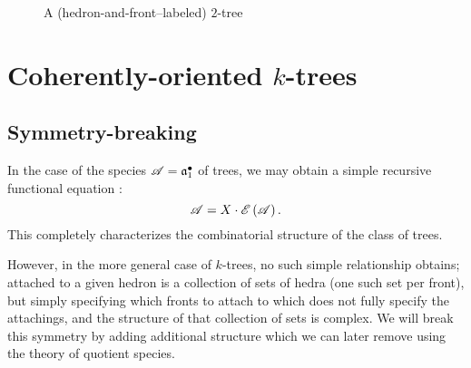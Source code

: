 \documentclass[sectionflow,singlespace,twoside]{brandiss} %
\numberwithin{section}{chapter}
\numberwithin{figure}{chapter}
\begin{document}
\begin{figure}[htb]
  \centering
  \caption{A (hedron-and-front--labeled) $2$-tree}
  \label{fig:exlab2tree}
\end{figure}

\section{Coherently-oriented $k$-trees}
\subsection{Symmetry-breaking}\label{ss:symbreak}
In the case of the species $\mathscr{A} = {\mathfrak{a}}^{\bullet }_{1}$ of trees, we may obtain a simple recursive functional equation \cite[\S 1, eq.\ (9)]{bll:species}:
\begin{equation}
  \label{eq:rtrees}
  \mathscr{A} = X \cdot \mathscr{E} \left( {\mathscr{A}} \right).
\end{equation}
This completely characterizes the combinatorial structure of the class of trees.

However, in the more general case of $k$-trees, no such simple relationship obtains; attached to a given hedron is a collection of sets of hedra (one such set per front), but simply specifying which fronts to attach to which does not fully specify the attachings, and the structure of that collection of sets is complex.
We will break this symmetry by adding additional structure which we can later remove using the theory of quotient species.
\end{document}
